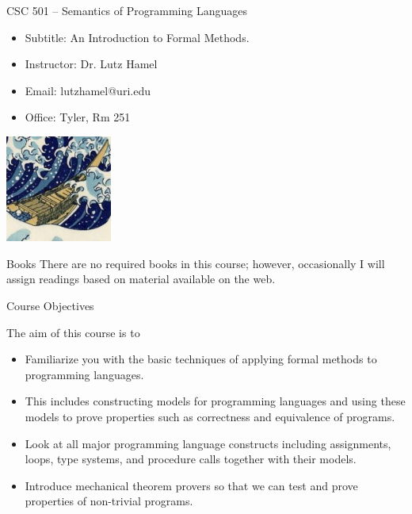 \documentclass{beamer}
\begin{document}
\begin{frame}{CSC 501 -- Semantics of Programming Languages}
\begin{itemize}
\item Subtitle: An Introduction to Formal Methods.
\item	Instructor: Dr. Lutz Hamel
\item	Email: lutzhamel@uri.edu
\item	Office: Tyler, Rm 251
\end{itemize}

\vspace{.1in}

\begin{center}
    \includegraphics[height=35mm]{images/hokusai}
\end{center}

\end{frame}

\begin{frame}{Books}
There are no required books in this course; however, occasionally I will assign readings based on material
available on the web.
\end{frame}

\begin{frame}{Course Objectives}

The aim of this course is to
\begin{itemize}
\item Familiarize you with the basic techniques of applying formal methods to programming languages.

\item This includes constructing models for programming languages and using these models to prove properties such as correctness and equivalence of programs.

\item Look at all major programming language constructs including assignments, loops, type systems, and procedure calls together with their models.

\item Introduce mechanical theorem provers so that we can test and prove properties of non-trivial programs.
\end{itemize}
\end{frame}
\end{document}

